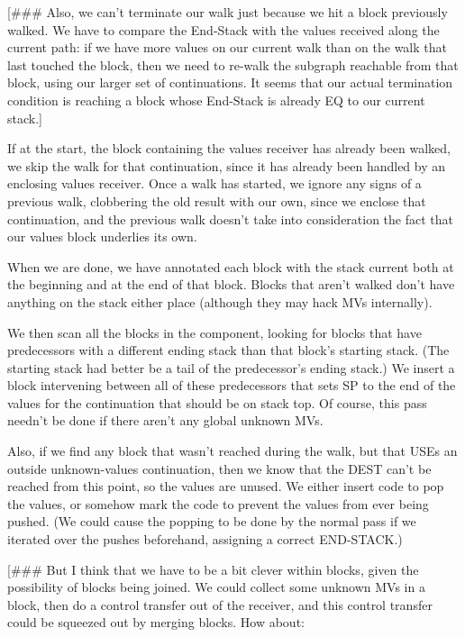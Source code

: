 [\#\#\# Also, we can't terminate our walk just because we hit a block previously
walked.  We have to compare the End-Stack with the values received along
the current path: if we have more values on our current walk than on the walk
that last touched the block, then we need to re-walk the subgraph reachable
from that block, using our larger set of continuations.  It seems that our
actual termination condition is reaching a block whose End-Stack is already EQ
to our current stack.]





If at the start, the block containing the values receiver has already been
walked, we skip the walk for that continuation, since it has already been
handled by an enclosing values receiver.  Once a walk has started, we
ignore any signs of a previous walk, clobbering the old result with our own,
since we enclose that continuation, and the previous walk doesn't take into
consideration the fact that our values block underlies its own.

When we are done, we have annotated each block with the stack current both at
the beginning and at the end of that block.  Blocks that aren't walked don't
have anything on the stack either place (although they may hack MVs
internally).  

We then scan all the blocks in the component, looking for blocks that have
predecessors with a different ending stack than that block's starting stack.
(The starting stack had better be a tail of the predecessor's ending stack.)
We insert a block intervening between all of these predecessors that sets SP to
the end of the values for the continuation that should be on stack top.  Of
course, this pass needn't be done if there aren't any global unknown MVs.

Also, if we find any block that wasn't reached during the walk, but that USEs
an outside unknown-values continuation, then we know that the DEST can't be
reached from this point, so the values are unused.  We either insert code to
pop the values, or somehow mark the code to prevent the values from ever being
pushed.  (We could cause the popping to be done by the normal pass if we
iterated over the pushes beforehand, assigning a correct END-STACK.)

[\#\#\# But I think that we have to be a bit clever within blocks, given the
possibility of blocks being joined.  We could collect some unknown MVs in a
block, then do a control transfer out of the receiver, and this control
transfer could be squeezed out by merging blocks.  How about:

